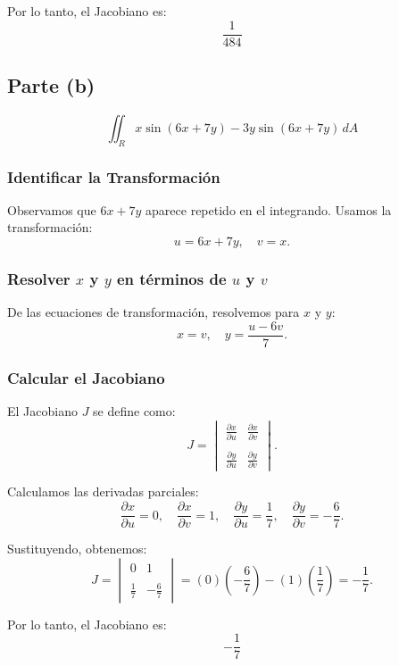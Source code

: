 Por lo tanto, el Jacobiano es:
\[
\boxed{\frac{1}{484}}
\]

\subsection*{Parte (b)}
\[
\iint_R x \sin(6x + 7y) - 3y \sin(6x + 7y) \, dA
\]

\subsubsection*{Identificar la Transformación}
Observamos que \(6x + 7y\) aparece repetido en el integrando. Usamos la transformación:
\[
u = 6x + 7y, \quad v = x.
\]

\subsubsection*{Resolver \(x\) y \(y\) en términos de \(u\) y \(v\)}
De las ecuaciones de transformación, resolvemos para \(x\) y \(y\):
\[
x = v, \quad y = \frac{u - 6v}{7}.
\]

\subsubsection*{Calcular el Jacobiano}
El Jacobiano \(J\) se define como:
\[
J = \begin{vmatrix}
\frac{\partial x}{\partial u} & \frac{\partial x}{\partial v} \\\\
\frac{\partial y}{\partial u} & \frac{\partial y}{\partial v}
\end{vmatrix}.
\]

Calculamos las derivadas parciales:
\[
\frac{\partial x}{\partial u} = 0, \quad \frac{\partial x}{\partial v} = 1, \quad \frac{\partial y}{\partial u} = \frac{1}{7}, \quad \frac{\partial y}{\partial v} = -\frac{6}{7}.
\]

Sustituyendo, obtenemos:
\[
J = \begin{vmatrix}
0 & 1 \\\\
\frac{1}{7} & -\frac{6}{7}
\end{vmatrix} = (0)(-\frac{6}{7}) - (1)(\frac{1}{7}) = -\frac{1}{7}.
\]

Por lo tanto, el Jacobiano es:
\[
\boxed{-\frac{1}{7}}
\]
